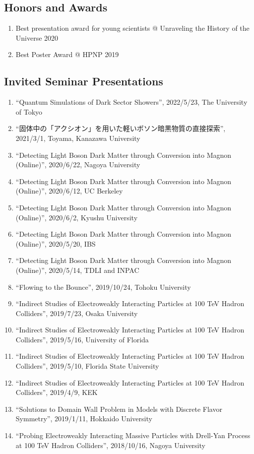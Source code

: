 \documentclass[12pt]{article}
\begin{document}
\subsection*{Honors and Awards}
\begin{enumerate}
 \item Best presentation award for young scientists @ Unraveling the History of the Universe 2020
 \item Best Poster Award @ HPNP 2019
\end{enumerate}



\nocite{*}

\subsection*{Invited Seminar Presentations}
\begin{enumerate}
 \item ``Quantum Simulations of Dark Sector Showers'', 2022/5/23, The University of Tokyo
 \item ``固体中の「アクシオン」を用いた軽いボソン暗黒物質の直接探索'', 2021/3/1, Toyama, Kanazawa University
 \item ``Detecting Light Boson Dark Matter through Conversion into Magnon (Online)'', 2020/6/22, Nagoya University
 \item ``Detecting Light Boson Dark Matter through Conversion into Magnon (Online)'', 2020/6/12, UC Berkeley
 \item ``Detecting Light Boson Dark Matter through Conversion into Magnon (Online)'', 2020/6/2, Kyushu University
 \item ``Detecting Light Boson Dark Matter through Conversion into Magnon (Online)'', 2020/5/20, IBS
 \item ``Detecting Light Boson Dark Matter through Conversion into Magnon (Online)'', 2020/5/14, TDLI and INPAC
 \item ``Flowing to the Bounce'', 2019/10/24, Tohoku University
 \item ``Indirect Studies of Electroweakly Interacting Particles at 100 TeV Hadron Colliders'', 2019/7/23, Osaka University
 \item ``Indirect Studies of Electroweakly Interacting Particles at 100 TeV Hadron Colliders'', 2019/5/16, University of Florida
 \item ``Indirect Studies of Electroweakly Interacting Particles at 100 TeV Hadron Colliders'', 2019/5/10, Florida State University
 \item ``Indirect Studies of Electroweakly Interacting Particles at 100 TeV Hadron Colliders'', 2019/4/9, KEK
 \item ``Solutions to Domain Wall Problem in Models with Discrete Flavor Symmetry'', 2019/1/11, Hokkaido University
 \item ``Probing Electroweakly Interacting Massive Particles with Drell-Yan Process at 100 TeV Hadron Colliders'', 2018/10/16, Nagoya University
\end{enumerate}
\end{document}
